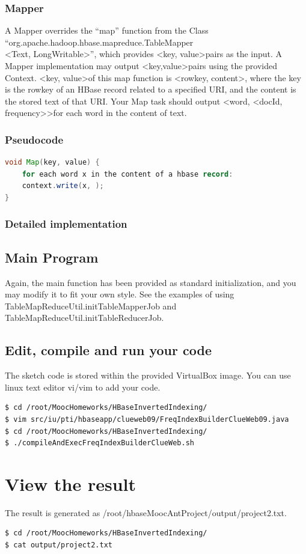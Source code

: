 \subsubsection*{Mapper}
A Mapper overrides the ``map'' function from the Class ``org.apache.hadoop.hbase.mapreduce.TableMapper\\
\textless Text, LongWritable\textgreater'', which provides \textless key, value\textgreater pairs as the input. A Mapper implementation may output \textless key,value\textgreater pairs using the provided Context.
\textless key, value\textgreater of this map function is \textless rowkey, content\textgreater, where the key is the rowkey of an HBase record related to a specified URI, and the content is the stored text of that URI. Your Map task should output \textless word, \textless docId, frequency\textgreater\textgreater for each word in the content of text.

\subsubsection*{Pseudocode}
\begin{lstlisting}[language=Java]
void Map(key, value) {
    for each word x in the content of a hbase record:
    context.write(x, );
}
\end{lstlisting}

\subsubsection*{Detailed implementation}


\subsection*{Main Program}
Again, the main function has been provided as standard initialization, and you
may modify it to fit your own style. See the examples of using
TableMapReduceUtil.initTableMapperJob and
TableMapReduceUtil.initTableReducerJob.

\subsection*{Edit, compile and run your code}
The sketch code is stored within the provided VirtualBox image. You can use
linux text editor vi/vim to add your code.

\begin{lstlisting}[language=bash]
$ cd /root/MoocHomeworks/HBaseInvertedIndexing/
$ vim src/iu/pti/hbaseapp/clueweb09/FreqIndexBuilderClueWeb09.java
$ cd /root/MoocHomeworks/HBaseInvertedIndexing/
$ ./compileAndExecFreqIndexBuilderClueWeb.sh
\end{lstlisting}

\section*{View the result}
The result is generated as /root/hbaseMoocAntProject/output/project2.txt. 
\begin{lstlisting}[language=bash]
$ cd /root/MoocHomeworks/HBaseInvertedIndexing/
$ cat output/project2.txt
\end{lstlisting}

